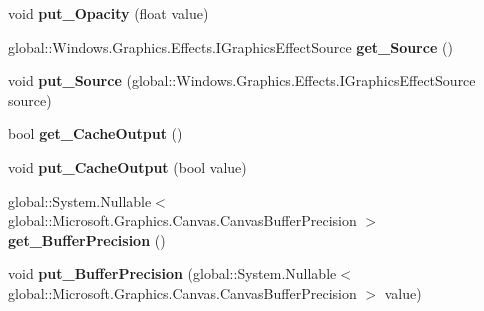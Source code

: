 \begin{DoxyCompactItemize}
\mbox{\label{class_microsoft_1_1_graphics_1_1_canvas_1_1_effects_1_1_opacity_effect_a12edc59773ce19245163b1e4f33ab94a}} 
void {\bfseries put\+\_\+\+Opacity} (float value)
\item 
\mbox{\label{class_microsoft_1_1_graphics_1_1_canvas_1_1_effects_1_1_opacity_effect_a2d98ab034bde8cfb8102ebc23ccf5f02}} 
global\+::\+Windows.\+Graphics.\+Effects.\+I\+Graphics\+Effect\+Source {\bfseries get\+\_\+\+Source} ()
\item 
\mbox{\label{class_microsoft_1_1_graphics_1_1_canvas_1_1_effects_1_1_opacity_effect_a51fd5110fa28908e4867c288ed9a30d9}} 
void {\bfseries put\+\_\+\+Source} (global\+::\+Windows.\+Graphics.\+Effects.\+I\+Graphics\+Effect\+Source source)
\item 
\mbox{\label{class_microsoft_1_1_graphics_1_1_canvas_1_1_effects_1_1_opacity_effect_a7a670a01415eb1ff9f50c8405404c02b}} 
bool {\bfseries get\+\_\+\+Cache\+Output} ()
\item 
\mbox{\label{class_microsoft_1_1_graphics_1_1_canvas_1_1_effects_1_1_opacity_effect_a42248a501afee0e1d6884be01879797e}} 
void {\bfseries put\+\_\+\+Cache\+Output} (bool value)
\item 
\mbox{\label{class_microsoft_1_1_graphics_1_1_canvas_1_1_effects_1_1_opacity_effect_a748e9f864efbadb3d647e448b13a4c17}} 
global\+::\+System.\+Nullable$<$ global\+::\+Microsoft.\+Graphics.\+Canvas.\+Canvas\+Buffer\+Precision $>$ {\bfseries get\+\_\+\+Buffer\+Precision} ()
\item 
\mbox{\label{class_microsoft_1_1_graphics_1_1_canvas_1_1_effects_1_1_opacity_effect_a820f4fb4c23935f2e1b9aa59a9c0a381}} 
void {\bfseries put\+\_\+\+Buffer\+Precision} (global\+::\+System.\+Nullable$<$ global\+::\+Microsoft.\+Graphics.\+Canvas.\+Canvas\+Buffer\+Precision $>$ value)

\end{DoxyCompactItemize}
